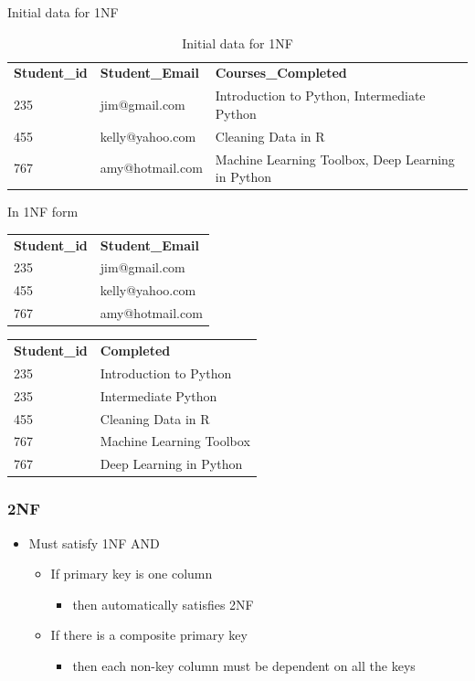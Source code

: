 Initial data for 1NF
\begin{table}[H]
    \caption{Initial data for 1NF}
    \label{tab:InitialData41NF}
    \begin{tabular}{lll}
        \textbf{Student\_id} & \textbf{Student\_Email} & \textbf{Courses\_Completed} \\
        235 & jim@gmail.com & Introduction to Python, Intermediate Python \\
        455 & kelly@yahoo.com & Cleaning Data in R \\
        767 & amy@hotmail.com & Machine Learning Toolbox, Deep Learning in Python
    \end{tabular}
\end{table}

In 1NF form
\begin{table}[H]
    \begin{tabular}{ll}
        \textbf{Student\_id} & \textbf{Student\_Email} \\
        235 & jim@gmail.com \\
        455 & kelly@yahoo.com \\
        767 & amy@hotmail.com
    \end{tabular}
\end{table}

\begin{table}[H]
    \begin{tabular}{ll}
        \textbf{Student\_id} & \textbf{Completed} \\
        235 & Introduction to Python \\
        235 & Intermediate Python \\
        455 & Cleaning Data in R \\
        767 & Machine Learning Toolbox \\
        767 & Deep Learning in Python
    \end{tabular}
\end{table}

\subsubsection{2NF}
\begin{itemize}
    \item Must satisfy 1NF AND
    \begin{itemize}
        \item If primary key is one column
        \begin{itemize}
            \item then automatically satisfies 2NF
        \end{itemize}
        \item If there is a composite primary key
        \begin{itemize}
            \item then each non-key column must be dependent on all the keys
        \end{itemize}
    \end{itemize}
\end{itemize}

